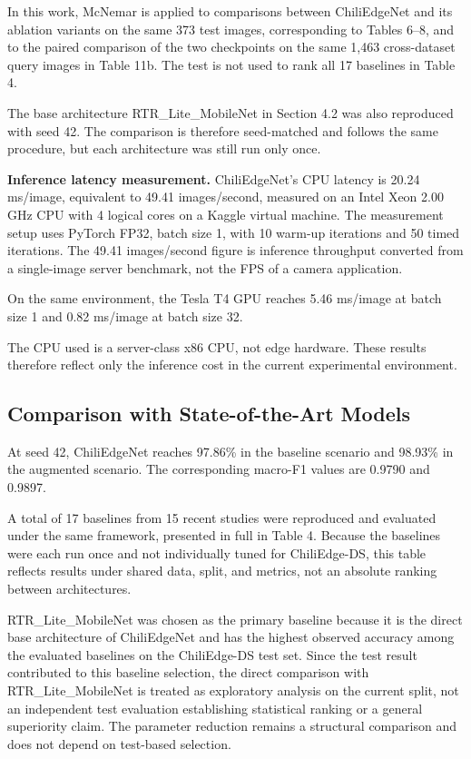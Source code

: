 In this work, McNemar is applied to comparisons between ChiliEdgeNet and its ablation variants on the same 373 test images, corresponding to Tables 6--8, and to the paired comparison of the two checkpoints on the same 1,463 cross-dataset query images in Table 11b. The test is not used to rank all 17 baselines in Table 4.

The base architecture RTR\_Lite\_MobileNet \cite{duhan2025} in Section 4.2 was also reproduced with seed 42. The comparison is therefore seed-matched and follows the same procedure, but each architecture was still run only once.

\textbf{Inference latency measurement.} ChiliEdgeNet's CPU latency is 20.24 ms/image, equivalent to 49.41 images/second, measured on an Intel Xeon 2.00 GHz CPU with 4 logical cores on a Kaggle virtual machine. The measurement setup uses PyTorch FP32, batch size 1, with 10 warm-up iterations and 50 timed iterations. The 49.41 images/second figure is inference throughput converted from a single-image server benchmark, not the FPS of a camera application.

On the same environment, the Tesla T4 GPU reaches 5.46 ms/image at batch size 1 and 0.82 ms/image at batch size 32.

The CPU used is a server-class x86 CPU, not edge hardware. These results therefore reflect only the inference cost in the current experimental environment.

\subsection{Comparison with State-of-the-Art Models}\label{comparison-with-state-of-the-art-models}

At seed 42, ChiliEdgeNet reaches 97.86\% in the baseline scenario and 98.93\% in the augmented scenario. The corresponding macro-F1 values are 0.9790 and 0.9897.

A total of 17 baselines from 15 recent studies were reproduced and evaluated under the same framework, presented in full in Table 4. Because the baselines were each run once and not individually tuned for ChiliEdge-DS, this table reflects results under shared data, split, and metrics, not an absolute ranking between architectures.

RTR\_Lite\_MobileNet \cite{duhan2025} was chosen as the primary baseline because it is the direct base architecture of ChiliEdgeNet and has the highest observed accuracy among the evaluated baselines on the ChiliEdge-DS test set. Since the test result contributed to this baseline selection, the direct comparison with RTR\_Lite\_MobileNet is treated as exploratory analysis on the current split, not an independent test evaluation establishing statistical ranking or a general superiority claim. The parameter reduction remains a structural comparison and does not depend on test-based selection.

